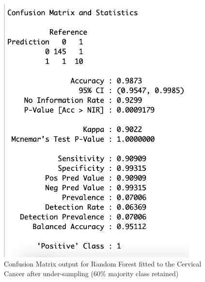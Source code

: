 \begin{figure}[!htbp]
    \centering
    \begin{minipage}{0.45\textwidth}
        \centering
        \includegraphics[width=0.9\textwidth]{ThesisTemplate/appendix/images/Chapter5Appendix/ConfusionMatrix60/CervicalCancer.png}
        \caption{Confusion Matrix output for Random Forest fitted to the Cervical Cancer after under-sampling (60\% majority class retained)}
        \label{fig:my_label}
    \end{minipage}\hfill
    \begin{minipage}{0.45\textwidth}
        \centering

\end{minipage}
\end{figure}
